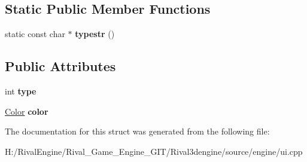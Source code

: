 \subsection*{Static Public Member Functions}
\begin{DoxyCompactItemize}
\item 
\mbox{\label{struct_u_i_1_1_fill_color_ac8012443ae61e19dfe6d44cfef1f2cfa}} 
static const char $\ast$ {\bfseries typestr} ()
\end{DoxyCompactItemize}
\subsection*{Public Attributes}
\begin{DoxyCompactItemize}
\item 
\mbox{\label{struct_u_i_1_1_fill_color_a6bfb2336b5452b7b9d2d1b536a11741c}} 
int {\bfseries type}
\item 
\mbox{\label{struct_u_i_1_1_fill_color_a6dbe318b465a1a5f0dec2578aaa3fe4c}} 
\hyperlink{struct_u_i_1_1_color}{Color} {\bfseries color}
\end{DoxyCompactItemize}


The documentation for this struct was generated from the following file\+:\begin{DoxyCompactItemize}
\item 
H\+:/\+Rival\+Engine/\+Rival\+\_\+\+Game\+\_\+\+Engine\+\_\+\+G\+I\+T/\+Rival3dengine/source/engine/ui.\+cpp\end{DoxyCompactItemize}
